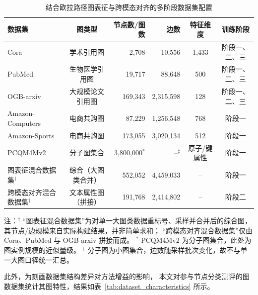 \begin{table}[htbp]
  \centering
  \small
  \caption{结合欧拉路径图表征与跨模态对齐的多阶段数据集配置}
  \label{tab:dataset_overview}
  \setlength{\tabcolsep}{4pt}
  \renewcommand{\arraystretch}{1.15}
  \begin{tabularx}{\textwidth}{@{}l c r r c c@{}}
    \toprule
    数据集 & 图类型 & 节点数/图数 & 边数 & 特征维度 & 训练阶段 \\
    \midrule
    Cora            & 学术引用图         & 2,708     & 10,556     & 1,433 & 阶段一、二、三 \\
    PubMed          & 生物医学引用图     & 19,717    & 88,648     & 500   & 阶段一、二、三 \\
    OGB-arxiv       & 大规模论文引用图   & 169,343   & 2,315,598  & 128   & 阶段一、二、三 \\
    Amazon-Computers& 电商共购图         & 87,229    & 1,256,548  & 768   & 阶段一 \\
    Amazon-Sports   & 电商共购图         & 173,055   & 3,020,134  & 512   & 阶段一 \\
    PCQM4Mv2        & 分子图集合         & 3,800,000$^*$ & --$^\ddagger$ & 原子/键属性 & 阶段一 \\
    \midrule
    图表征混合数据集$^\dagger$     & 综合（大图类合并） & 552,052 & 4,459,033 & -- & 阶段一 \\
    跨模态对齐混合数据集$^\dagger$ & 文本属性图（拼接） & 191,768 & 2,414,802 & -- & 阶段二 \\
    \bottomrule
  \end{tabularx}

  {\raggedright\footnotesize
  注：$^\dagger$ “图表征混合数据集”为对单一大图类数据重标号、采样并合并后的综合图，其节点/边规模来自实际构建结果，并非简单求和；
  “跨模态对齐混合数据集”仅由 Cora、PubMed 与 OGB-arxiv 拼接而成。\;
  $^*$ PCQM4Mv2 为分子图集合，此处为图实例规模的近似量级。\;
  $^\ddagger$ 分子图为小图集合，边数随采样批次变化，故不与单一大图口径统一汇总。\par}
\end{table}

此外，为刻画数据集结构差异对方法增益的影响，
本文对参与节点分类测评的图数据集统计其图特性，结果如表~\ref{tab:dataset_characteristics} 所示。

